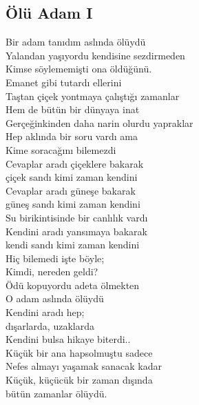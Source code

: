 \subsection{Ölü Adam I}

Bir adam tanıdım aslında ölüydü \\
Yalandan yaşıyordu kendisine sezdirmeden \\
Kimse söylememişti ona öldüğünü. \\

\noindent\newline
Emanet gibi tutardı ellerini \\
Taştan çiçek yontmaya çalıştığı zamanlar \\
Hem de bütün bir dünyaya inat \\
Gerçeğinkinden daha narin olurdu yapraklar \\

\noindent\newline
Hep aklında bir soru vardı ama \\
Kime soracağını bilemezdi \\
Cevaplar aradı çiçeklere bakarak \\
çiçek sandı kimi zaman kendini \\
Cevaplar aradı güneşe bakarak \\
güneş sandı kimi zaman kendini \\
Su birikintisinde bir canlılık vardı \\
Kendini aradı yansımaya bakarak \\
kendi sandı kimi zaman kendini \\
Hiç bilemedi işte böyle; \\
Kimdi, nereden geldi? \\

\noindent\newline
Ödü kopuyordu adeta ölmekten \\
O adam aslında ölüydü \\
Kendini aradı hep; \\
dışarlarda, uzaklarda \\
Kendini bulsa hikaye biterdi.. \\
Küçük bir ana hapsolmuştu sadece \\
Nefes almayı yaşamak sanacak kadar \\
Küçük, küçücük bir zaman dışında \\
bütün zamanlar ölüydü. \\